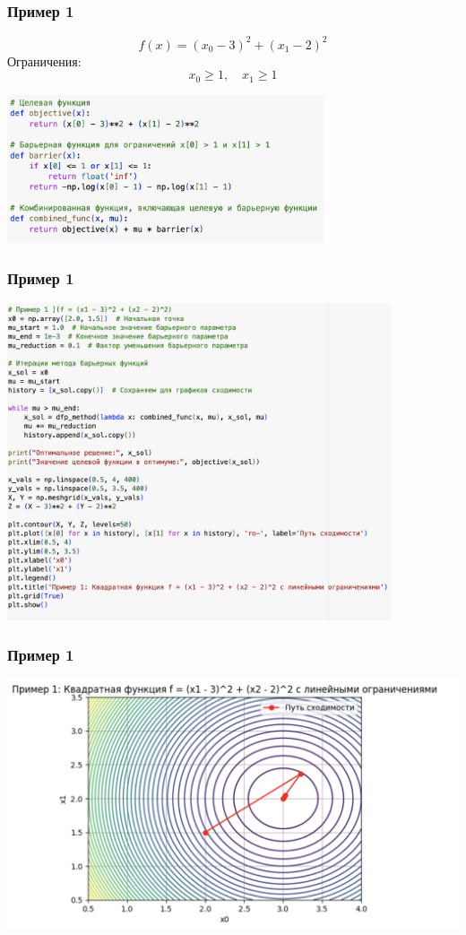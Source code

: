 \documentclass[12pt,pdf,hyperref={unicode}]{beamer}
\begin{document}
\begin{frame}
\frametitle{Пример 1}
\[
f(x) = (x_0 - 3)^2 + (x_1 - 2)^2
\]
Ограничения: \\
\[
x_0 \geq 1, \quad x_1 \geq 1
\]
\begin{itemize}
\end{itemize}
\begin{center}
    \includegraphics[width=0.7\textwidth]{image3.png}
\end{center}
\end{frame}

\begin{frame}
\frametitle{Пример 1}
\begin{center}
    \includegraphics[width=0.85\textwidth]{image4.png}
\end{center}
\end{frame}

\begin{frame}
\frametitle{Пример 1}
\begin{center}
    \includegraphics[width=1\textwidth]{image5.png}
\end{center}
\end{frame}
\end{document}
